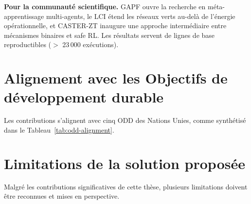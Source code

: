 \textbf{Pour la communauté scientifique.}
GAPF ouvre la recherche en méta-apprentissage multi-agents, le LCI étend les réseaux verts au-delà de l'énergie opérationnelle, et CASTER-ZT inaugure une approche intermédiaire entre mécanismes binaires et safe RL. Les résultats servent de lignes de base reproductibles ($>$ 23\,000 exécutions).


\section{Alignement avec les Objectifs de développement durable}\label{sec:concl-odd}

Les contributions s'alignent avec cinq ODD des Nations Unies, comme synthétisé dans le Tableau~\ref{tab:odd-alignment}.

\begin{table}[htbp]
\centering
\caption{Alignement des contributions avec les ODD des Nations Unies.}
\label{tab:odd-alignment}
\end{table}


\section{Limitations de la solution proposée}\label{sec:concl-limitations}

Malgré les contributions significatives de cette thèse, plusieurs limitations doivent être reconnues et mises en perspective.

